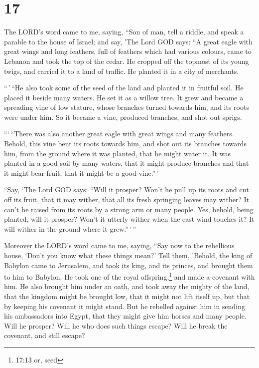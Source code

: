 \hypertarget{section-15}{%
\section{17}\label{section-15}}

 The LORD's word came to me, saying,  ``Son of
man, tell a riddle, and speak a parable to the house of Israel;
 and say, 'The Lord GOD says: ``A great eagle with great
wings and long feathers, full of feathers which had various colours,
came to Lebanon and took the top of the cedar.  He cropped
off the topmost of its young twigs, and carried it to a land of traffic.
He planted it in a city of merchants.

 ``\,'\,``He also took some of the seed of the land and
planted it in fruitful soil. He placed it beside many waters. He set it
as a willow tree.  It grew and became a spreading vine of
low stature, whose branches turned towards him, and its roots were under
him. So it became a vine, produced branches, and shot out sprigs.

 ```\,``There was also another great eagle with great wings
and many feathers. Behold, this vine bent its roots towards him, and
shot out its branches towards him, from the ground where it was planted,
that he might water it.  It was planted in a good soil by
many waters, that it might produce branches and that it might bear
fruit, that it might be a good vine.''\,'

 ``Say, `The Lord GOD says: ``Will it prosper? Won't he pull
up its roots and cut off its fruit, that it may wither, that all its
fresh springing leaves may wither? It can't be raised from its roots by
a strong arm or many people.  Yes, behold, being planted,
will it prosper? Won't it utterly wither when the east wind touches it?
It will wither in the ground where it grew.''\,'\,''

 Moreover the LORD's word came to me, saying, 
``Say now to the rebellious house, `Don't you know what these things
mean?' Tell them, 'Behold, the king of Babylon came to Jerusalem, and
took its king, and its princes, and brought them to him to Babylon.
 He took one of the royal offspring,\footnote{17:13 or,
  seed} and made a covenant with him. He also brought him under an oath,
and took away the mighty of the land,  that the kingdom
might be brought low, that it might not lift itself up, but that by
keeping his covenant it might stand.  But he rebelled
against him in sending his ambassadors into Egypt, that they might give
him horses and many people. Will he prosper? Will he who does such
things escape? Will he break the covenant, and still escape?

